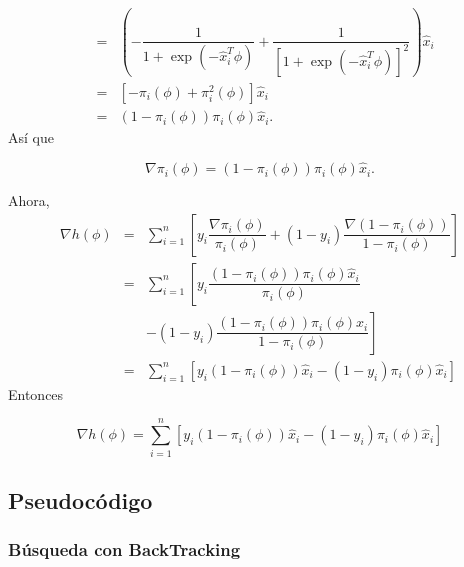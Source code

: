 \documentclass[11pt,letterpaper]{article}
\theoremstyle{definition}
\theoremstyle{definition}
\theoremstyle{definition}
\begin{document}
\begin{eqnarray*}
	& = & \left(- \dfrac{1}{1 + \exp(-\hat{x}_i^T \phi)}  + \dfrac{1}{[1 + \exp(-\hat{x}_i^T \phi)]^2}\right) \hat{x}_i \\
	& = & [- \pi_i(\phi) + \pi_i^2 (\phi)] \hat{x}_i \\
	& = & (1 -  \pi_i(\phi))  \pi_i(\phi) \hat{x}_i.
\end{eqnarray*}
Así que
\begin{shaded*}
	\begin{equation}
		\nabla \pi_i (\phi) = (1 -  \pi_i(\phi))  \pi_i(\phi) \hat{x}_i.
	\end{equation}
\end{shaded*}
Ahora,
\begin{eqnarray*}
	\nabla h(\phi) & = & \sum_{i = 1}^n \left[ y_i \dfrac{\nabla \pi_i(\phi)}{\pi_i(\phi)} + ( 1 - y_i)\dfrac{\nabla (1 - \pi_i(\phi))}{1 - \pi_i(\phi)}  \right] \\
				   & = & \sum_{i = 1}^n \left[ y_i \dfrac{(1 - \pi_i(\phi)) \pi_i(\phi) \hat{x}_i}{\pi_i(\phi)} \right. \\
				   &   & \left. - ( 1 - y_i)\dfrac{(1 - \pi_i(\phi)) \pi_i(\phi) \hat{x}_i}{1 - \pi_i(\phi)}  \right] \\
				   & = & \sum_{i = 1}^n \left[ y_i (1 - \pi_i(\phi)) \hat{x}_i  - ( 1 - y_i) \pi_i(\phi) \hat{x}_i  \right] 
\end{eqnarray*}
Entonces
\begin{shaded*}
\begin{equation*}
	\nabla h(\phi) = \sum_{i = 1}^n \left[ y_i (1 - \pi_i(\phi)) \hat{x}_i  - ( 1 - y_i) \pi_i(\phi) \hat{x}_i  \right] 
\end{equation*}	
\end{shaded*}
\subsection{Pseudocódigo}
\subsubsection{Búsqueda con BackTracking}
\begin{shaded*}
	\begin{algorithmic}[1]
		\EndWhile
	\end{algorithmic}
\end{shaded*}
\end{document}
